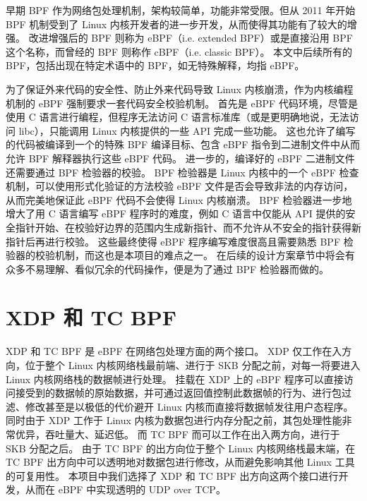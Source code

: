 早期 BPF 作为网络包处理机制，架构较简单，功能非常受限。但从 2011 年开始 BPF 机制受到了 Linux 内核开发者的进一步开发，从而使得其功能有了较大的增强。
改进增强后的 BPF 则称为 eBPF（i.e. extended BPF）或是直接沿用 BPF 这个名称，而曾经的 BPF 则称作 cBPF（i.e. classic BPF）。\cite{10.1145/3371038}
本文中后续所有的 BPF，包括出现在特定术语中的 BPF，如无特殊解释，均指 eBPF。

为了保证外来代码的安全性、防止外来代码导致 Linux 内核崩溃，作为内核编程机制的 eBPF 强制要求一套代码安全校验机制。
首先是 eBPF 代码环境，尽管是使用 C 语言进行编程，但程序无法访问 C 语言标准库（或是更明确地说，无法访问 libc），只能调用 Linux 内核提供的一些 API 完成一些功能。
这也允许了编写的代码被编译到一个的特殊 BPF 编译目标、包含 eBPF 指令到二进制文件中从而允许 BPF 解释器执行这些 eBPF 代码。
进一步的，编译好的 eBPF 二进制文件还需要通过 BPF 检验器的校验。
BPF 检验器是 Linux 内核中的一个 eBPF 检查机制，可以使用形式化验证的方法校验 eBPF 文件是否会导致非法的内存访问，从而完美地保证此 eBPF 代码不会使得 Linux 内核崩溃。
BPF 检验器进一步地增大了用 C 语言编写 eBPF 程序时的难度，例如 C 语言中仅能从 API 提供的安全指针开始、在校验好边界的范围内生成新指针、而不允许从不安全的指针获得新指针后再进行校验。
这些最终使得 eBPF 程序编写难度很高且需要熟悉 BPF 检验器的校验机制，而这也是本项目的难点之一。
在后续的设计方案章节中将会有众多不易理解、看似冗余的代码操作，便是为了通过 BPF 检验器而做的。

\section{XDP 和 TC BPF}

XDP 和 TC BPF 是 eBPF 在网络包处理方面的两个接口。
XDP 仅工作在入方向，位于整个 Linux 内核网络栈最前端、进行于 SKB 分配之前，对每一将要进入 Linux 内核网络栈的数据帧进行处理。
挂载在 XDP 上的 eBPF 程序可以直接访问接受到的数据帧的原始数据，并可通过返回值控制此数据帧的行为、进行包过滤、修改甚至是以极低的代价避开 Linux 内核而直接将数据帧发往用户态程序。
同时由于 XDP 工作于 Linux 内核为数据包进行内存分配之前，其包处理性能非常优异，吞吐量大、延迟低。
而 TC BPF 而可以工作在出入两方向，进行于 SKB 分配之后。
由于 TC BPF 的出方向位于整个 Linux 内核网络栈最末端，在 TC BPF 出方向中可以透明地对数据包进行修改，从而避免影响其他 Linux 工具的可复用性。
本项目中我们选择了 XDP 和 TC BPF 出方向这两个接口进行开发，从而在 eBPF 中实现透明的 UDP over TCP。
